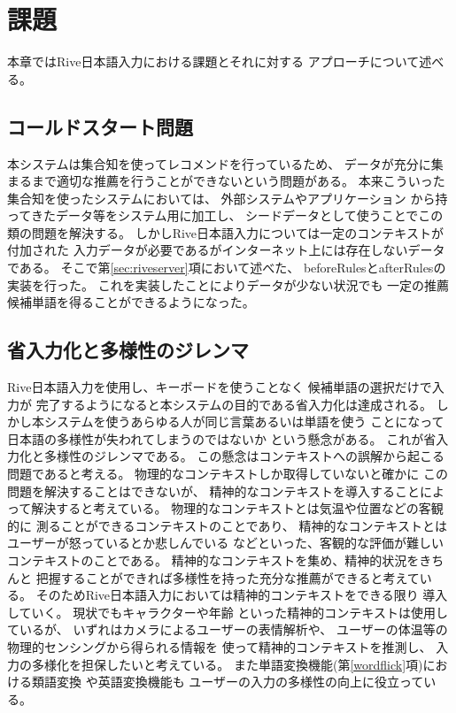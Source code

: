 \chapter{課題}
\label{chap:discussion}
本章ではRive日本語入力における課題とそれに対する
アプローチについて述べる。

\newpage
\section{コールドスタート問題}
本システムは集合知を使ってレコメンドを行っているため、
データが充分に集まるまで適切な推薦を行うことができないという問題がある。
本来こういった集合知を使ったシステムにおいては、
外部システムやアプリケーション
から持ってきたデータ等をシステム用に加工し、
シードデータとして使うことでこの類の問題を解決する。
しかしRive日本語入力については一定のコンテキストが付加された
入力データが必要であるがインターネット上には存在しないデータである。
そこで第\ref{sec:riveserver}項において述べた、
beforeRulesとafterRulesの実装を行った。
これを実装したことによりデータが少ない状況でも
一定の推薦候補単語を得ることができるようになった。

\section{省入力化と多様性のジレンマ}
Rive日本語入力を使用し、キーボードを使うことなく
候補単語の選択だけで入力が
完了するようになると本システムの目的である省入力化は達成される。
しかし本システムを使うあらゆる人が同じ言葉あるいは単語を使う
ことになって日本語の多様性が失われてしまうのではないか
という懸念がある。
これが省入力化と多様性のジレンマである。
この懸念はコンテキストへの誤解から起こる問題であると考える。
物理的なコンテキストしか取得していないと確かに
この問題を解決することはできないが、
精神的なコンテキストを導入することによって解決すると考えている。
物理的なコンテキストとは気温や位置などの客観的に
測ることができるコンテキストのことであり、
精神的なコンテキストとはユーザーが怒っているとか悲しんでいる
などといった、客観的な評価が難しいコンテキストのことである。
精神的なコンテキストを集め、精神的状況をきちんと
把握することができれば多様性を持った充分な推薦ができると考えている。
そのためRive日本語入力においては精神的コンテキストをできる限り
導入していく。
現状でもキャラクターや年齢
といった精神的コンテキストは使用しているが、
いずれはカメラによるユーザーの表情解析や、
ユーザーの体温等の物理的センシングから得られる情報を
使って精神的コンテキストを推測し、
入力の多様化を担保したいと考えている。
また単語変換機能(第\ref{wordflick}項)における類語変換
や英語変換機能も
ユーザーの入力の多様性の向上に役立っている。

